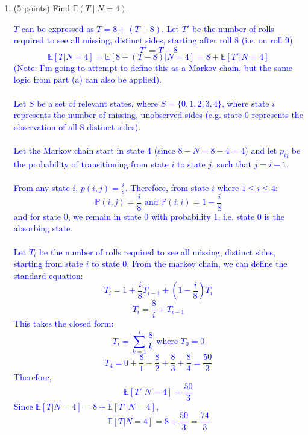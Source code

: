 \documentclass{article}
\begin{document}
\begin{enumerate}[label=(\alph*)]
    \item (5 points) Find $\mathbb{E}(T \mid N = 4)$.

    \textcolor{blue}{$T$ can be expressed as $T=8+(T-8)$. Let $T'$ be the number of rolls required to see all missing, distinct sides, starting after roll 8 (i.e. on roll 9). $$T'=T-8$$ 
    $$\mathbb{E}[T | N = 4]=\mathbb{E}[8+(T-8)|N=4]=8+\mathbb{E}[T'|N=4]$$
    (Note: I'm going to attempt to define this as a Markov chain, but the same logic from part (a) can also be applied). \\ \\ 
    Let $S$ be a set of relevant states, where $S=\{0,1,2,3,4\}$, where state $i$ represents the number of missing, unobserved sides (e.g. state 0 represents the observation of all 8 distinct sides). \\ \\ 
    Let the Markov chain start in state 4 (since $8-N=8-4=4$) and let $p_{ij}$ be the probability of transitioning from state $i$ to state $j$, such that $j=i-1$. \\ \\
From any state $i$, $p(i,j)=\frac{i}{8}$. Therefore, from state $i$ where $1\leq i \leq 4$: $$\mathbb{P}(i,j)=\frac{i}{8} \text{ and } \mathbb{P}(i,i)=1-\frac{i}{8}$$
and for state 0, we remain in state 0 with probability 1, i.e. state 0 is the absorbing state. \\ \\
Let $T_i$ be the number of rolls required to see all missing, distinct sides, starting from state $i$ to state 0. From the markov chain, we can define the standard equation:
$$T_i=1+\frac{i}{8}T_{i-1}+\left(1-\frac{i}{8}\right)T_i$$
$$T_i=\frac{8}{i}+T_{i-1}$$
This takes the closed form: $$T_i=\sum_{k=1}^{i}\frac{8}{k} \text{ where } T_0=0$$
$$T_4 = 0 + \frac{8}{1} + \frac{8}{2} + \frac{8}{3} + \frac{8}{4} = \frac{50}{3}$$
Therefore, $$\mathbb{E}[T'|N=4]=\frac{50}{3}$$
Since $\mathbb{E}[T|N=4]=8+\mathbb{E}[T'|N=4]$, $$\mathbb{E}[T|N=4]=8+\frac{50}{3}=\frac{74}{3}$$}

\end{enumerate}
\end{document}

